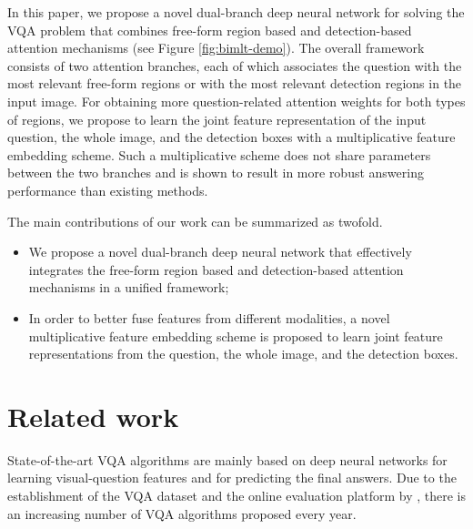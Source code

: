 \documentclass[letterpaper]{article}
\begin{document}
In this paper, we propose a novel dual-branch deep neural network for solving the VQA problem that combines free-form region based and detection-based attention mechanisms (see Figure \ref{fig:bimlt-demo}). The overall framework consists of two attention branches, each of which associates the question with the most relevant free-form regions or with the most relevant detection regions in the input image. For obtaining more question-related attention weights for both types of regions, we propose to learn the joint feature representation of the input question, the whole image, and the detection boxes with a multiplicative feature embedding scheme. Such a multiplicative scheme does not share parameters between the two branches and is shown to result in more robust answering performance than existing methods.



The main contributions of our work can be summarized as twofold.
\begin{itemize}
	\item We propose a novel dual-branch deep neural network that effectively integrates the free-form region based and detection-based attention mechanisms in a unified framework;
	\item In order to better fuse features from different modalities, a novel multiplicative feature embedding scheme is proposed to learn joint feature representations from the question, the whole image, and the detection boxes.
\end{itemize}


\section{Related work}

State-of-the-art VQA algorithms are mainly based on deep neural networks for learning visual-question features and for predicting the final answers. Due to the establishment of the VQA dataset and the online evaluation platform by \cite{antol2015vqa}, there is an increasing number of VQA algorithms proposed every year.
\end{document}
